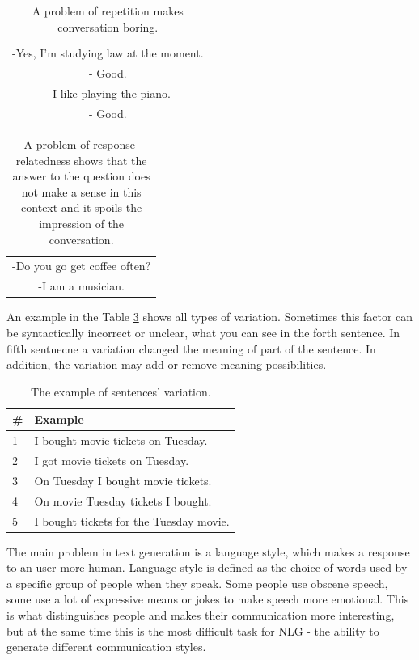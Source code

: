 \begin{table}[t]
\centering
 \begin{tabular}{|c|} 
 \hline
  -Yes, I'm studying law at the moment.\\
  - Good. \\
  - I like playing the piano. \\
  - Good. \\
 \hline
 \end{tabular}
 \caption{A problem of repetition makes conversation boring.}
\label{tab:repetition_prob}
\end{table}

\begin{table}[t]
\centering
 \begin{tabular}{|c|} 
 \hline
 -Do you go get coffee often? \\
 -I am a musician. \\
 \hline
 \end{tabular}
 \caption{A problem of response-relatedness shows that the answer to the question does not make a sense in this context and it spoils the impression of the conversation.}
\label{tab:response_relatedness_prob}
\end{table}

An example in the Table \ref{tab:var_example} shows all types of variation. Sometimes this factor can be syntactically incorrect or unclear, what you can see in the forth sentence. In fifth sentnecne a variation changed the meaning of part of the sentence. In addition, the variation may add or remove meaning possibilities.

\begin{table}[t]
\centering
 \begin{tabular}{|p{0.5cm}|p{8cm}|} 
 \hline
 \# & Example \\
 \hline
 1 & I bought movie tickets on Tuesday. \\ 
 \hline
 2 & I got movie tickets on Tuesday. \\
 \hline
 3 & On Tuesday I bought movie tickets. \\
 \hline
 4 & On movie Tuesday tickets I bought. \\
 \hline
 5 & I bought tickets for the Tuesday movie. \\ 
 \hline
 \end{tabular}
 \caption{The example of sentences' variation.}
\label{tab:var_example}
\end{table}

The main problem in text generation is a language style, which makes a response to an user more human. Language style is defined as the choice of words used by a specific group of people when they speak. Some people use obscene speech, some use a lot of expressive means or jokes to make speech more emotional. This is what distinguishes people and makes their communication more interesting, but at the same time this is the most difficult task for NLG - the ability to generate different communication styles.

